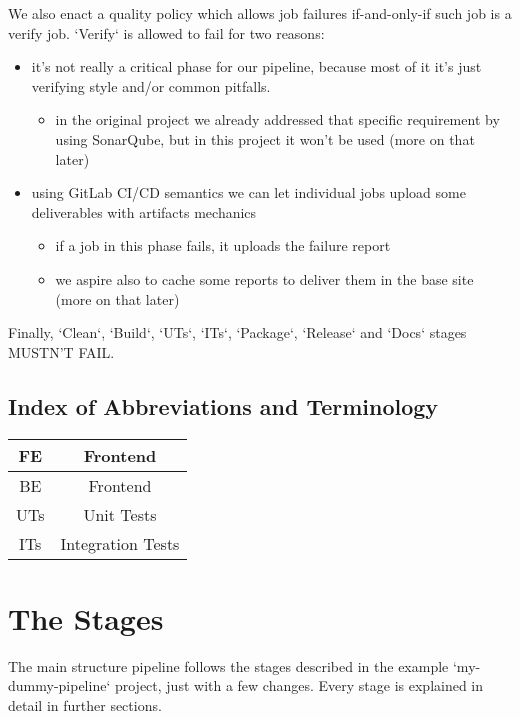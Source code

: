 \documentclass[a4paper,10pt]{scrartcl}
\begin{document}
We also enact a quality policy which allows job failures if-and-only-if such job is a verify job. `Verify` is allowed to fail for two reasons:
\begin{itemize}
    \item it's not really a critical phase for our pipeline, because most of it it's just verifying style and/or common pitfalls.
    \begin{itemize}
        \item in the original project we already addressed that specific requirement by using SonarQube, but in this project it won't be used (more on that later)
    \end{itemize}
    \item using GitLab CI/CD semantics we can let individual jobs upload some deliverables with artifacts mechanics
    \begin{itemize}
        \item if a job in this phase fails, it uploads the failure report
        \item we aspire also to cache some reports to deliver them in the base site (more on that later)
    \end{itemize}
\end{itemize}

Finally, `Clean`, `Build`, `UTs`, `ITs`, `Package`, `Release` and `Docs` stages MUSTN'T FAIL.

\subsection{Index of Abbreviations and Terminology}

\begin{center}
    \begin{tabular}{|c|c|}
         \hline
         FE & Frontend \\
         \hline
         BE & Frontend \\
         \hline
         UTs & Unit Tests \\
         \hline
         ITs & Integration Tests \\
         \hline
    \end{tabular}
\end{center}

\section{The Stages}

The main structure pipeline follows the stages described in the example `my-dummy-pipeline` project, just with a few changes. Every stage is explained in detail in further sections.
\end{document}
